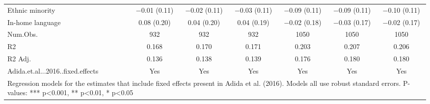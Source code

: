\begin{table}[H]
\begin{tabular}[t]{lcccccc}
Ethnic minority & \num{-0.01} (\num{0.11}) & \num{-0.02} (\num{0.11}) & \num{-0.03} (\num{0.11}) & \num{-0.09} (\num{0.11}) & \num{-0.09} (\num{0.11}) & \num{-0.10} (\num{0.11})\\
In-home language & \num{0.08} (\num{0.20}) & \num{0.04} (\num{0.20}) & \num{0.04} (\num{0.19}) & \num{-0.02} (\num{0.18}) & \num{-0.03} (\num{0.17}) & \num{-0.02} (\num{0.17})\\
\midrule
Num.Obs. & \num{932} & \num{932} & \num{932} & \num{1050} & \num{1050} & \num{1050}\\
R2 & \num{0.168} & \num{0.170} & \num{0.171} & \num{0.203} & \num{0.207} & \num{0.206}\\
R2 Adj. & \num{0.136} & \num{0.138} & \num{0.139} & \num{0.176} & \num{0.180} & \num{0.180}\\
Adida.et.al...2016..fixed.effects & Yes & Yes & Yes & Yes & Yes & Yes\\
\bottomrule
\multicolumn{7}{l}{\rule{0pt}{1em}Regression models for the estimates that include fixed effects present in Adida et al. (2016). Models all use robust standard errors. P-values: *** p<0.001, ** p<0.01, * p<0.05}\\
\end{tabular}
\end{table}
